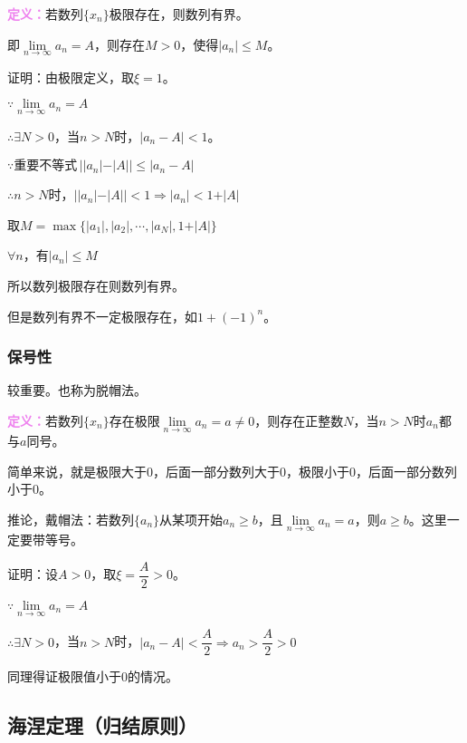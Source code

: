 \documentclass[UTF8, 12pt]{ctexart}
\begin{document}
        \textcolor{violet}{\textbf{定义：}}若数列$\{x_n\}$极限存在，则数列有界。

        即$\lim\limits_{n\to\infty}a_n=A$，则存在$M>0$，使得$\vert a_n\vert\leqslant M$。

        证明：由极限定义，取$\xi=1$。

        $\because\lim\limits_{n\to\infty}a_n=A$

        $\therefore\exists N>0$，当$n>N$时，$\vert a_n-A\vert<1$。

        $\because\text{重要不等式}\,\vert\vert a_n\vert-\vert A\vert\vert\leqslant\vert a_n-A\vert$

        $\therefore n>N$时，$\vert\vert a_n\vert-\vert A\vert\vert<1\Rightarrow\vert a_n\vert<1+\vert A\vert$

        取$M=\max\{\vert a_1\vert,\vert a_2\vert,\cdots,\vert a_N\vert,1+\vert A\vert\}$

        $\forall n$，有$\vert a_n\vert\leqslant M$

        所以数列极限存在则数列有界。

        但是数列有界不一定极限存在，如$1+(-1)^n$。

        \subsubsection{保号性}

        较重要。也称为脱帽法。

        \textcolor{violet}{\textbf{定义：}}若数列$\{x_n\}$存在极限$\lim\limits_{n\to\infty}a_n=a\neq 0$，则存在正整数$N$，当$n>N$时$a_n$都与$a$同号。

        简单来说，就是极限大于0，后面一部分数列大于0，极限小于0，后面一部分数列小于0。

        推论，戴帽法：若数列$\{a_n\}$从某项开始$a_n\geqslant b$，且$\lim\limits_{n\to\infty}a_n=a$，则$a\geqslant b$。这里一定要带等号。

        证明：设$A>0$，取$\xi=\dfrac{A}{2}>0$。

        $\because\lim\limits_{n\to\infty}a_n=A$

        $\therefore\exists N>0$，当$n>N$时，$\vert a_n-A\vert<\dfrac{A}{2}\Rightarrow a_n>\dfrac{A}{2}>0$

        同理得证极限值小于0的情况。

        \subsection{海涅定理（归结原则）}
\end{document}
